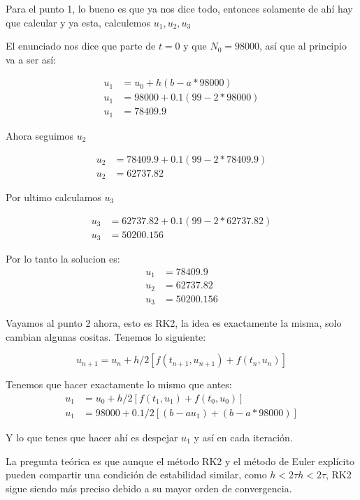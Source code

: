 
Para el punto 1, lo bueno es que ya nos dice todo, entonces solamente de ahí hay que calcular y ya esta, calculemos $u_1, u_2, u_3$

El enunciado nos dice que parte de $t = 0$ y que $N_0 = 98000$, así que al principio va a ser así: 

\begin{align*}
    u_1 &= u_0 + h(b-a*98000) \\
    u_1 &= 98000 + 0.1(99-2*98000)\\
    u_1 &= 78409.9
\end{align*}

Ahora seguimos $u_2$

\begin{align*}
    u_2 &= 78409.9 + 0.1(99-2*78409.9)\\
    u_2 &= 62737.82
\end{align*}

Por ultimo calculamos $u_3$

\begin{align*}
    u_3 &= 62737.82 + 0.1(99-2*62737.82) \\
    u_3 &= 50200.156
\end{align*}

Por lo tanto la solucion es: 
\begin{align*}
    u_1 &= 78409.9\\
    u_2 &= 62737.82\\
    u_3 &= 50200.156
\end{align*}


Vayamos al punto 2 ahora, esto es RK2, la idea es exactamente la misma, solo cambian algunas cositas. Tenemos lo siguiente:

$$ u_{n+1} = u_n + h/2 [f(t_{n+1}, u_{n+1}) +f(t_{n}, u_{n}) ] $$

Tenemos que hacer exactamente lo mismo que antes: 
\begin{align*}
    u_{1} &= u_0 + h/2 [f(t_{1}, u_{1}) +f(t_{0}, u_{0}) ]\\
    u_{1} &= 98000 + 0.1/2 [(b -au_1) + (b - a*98000)]
\end{align*}

Y lo que tenes que hacer ahí es despejar $u_1$ y así en cada iteración.

La pregunta teórica es que aunque el método RK2 y el método de Euler explícito pueden compartir una condición de estabilidad similar, como $h<2\tau h<2\tau$, RK2 sigue siendo más preciso debido a su mayor orden de convergencia.

